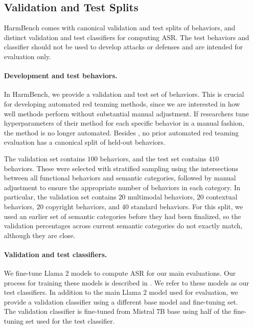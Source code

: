 \subsection{Validation and Test Splits}

HarmBench comes with canonical validation and test splits of behaviors, and distinct validation and test classifiers for computing ASR. The test behaviors and classifier should not be used to develop attacks or defenses and are intended for evaluation only.

\paragraph{Development and test behaviors.}
In HarmBench, we provide a validation and test set of behaviors. This is crucial for developing automated red teaming methods, since we are interested in how well methods perform without substantial manual adjustment. If researchers tune hyperparameters of their method for each specific behavior in a manual fashion, the method is no longer automated. Besides \citet{tdc2023}, no prior automated red teaming evaluation has a canonical split of held-out behaviors.

The validation set contains $100$ behaviors, and the test set contains $410$ behaviors. These were selected with stratified sampling using the intersections between all functional behaviors and semantic categories, followed by manual adjustment to ensure the appropriate number of behaviors in each category. In particular, the validation set contains $20$ multimodal behaviors, $20$ contextual behaviors, $20$ copyright behaviors, and $40$ standard behaviors. For this split, we used an earlier set of semantic categories before they had been finalized, so the validation percentages across current semantic categories do not exactly match, although they are close.

\paragraph{Validation and test classifiers.}
We fine-tune Llama 2 models to compute ASR for our main evaluations. Our process for training these models is described in . We refer to these models as our test classifiers. In addition to the main Llama 2 model used for evaluation, we provide a validation classifier using a different base model and fine-tuning set. The validation classifier is fine-tuned from Mistral 7B base using half of the fine-tuning set used for the test classifier.

